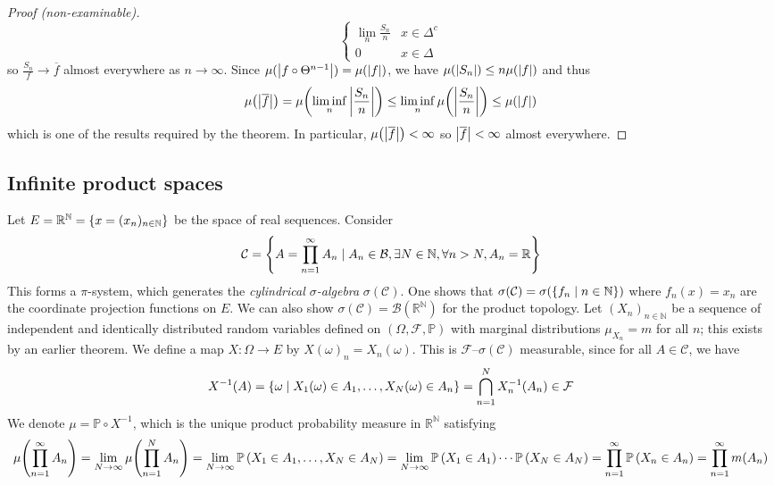 \begin{proof}[Proof (non-examinable)]
\[\begin{cases}
        \lim_n \frac{S_n}{n} & x \in \Delta^c \\
        0 & x \in \Delta
    \end{cases} \]
    so \( \frac{S_n}{f} \to \overline f \) almost everywhere as \( n \to \infty \).
    Since \( \mu(\abs{f \circ \Theta^{n-1}}) = \mu(\abs{f}) \), we have \( \mu(\abs{S_n}) \leq n \mu(\abs{f}) \) and thus
    \[ \mu\qty(\abs{\overline f}) = \mu\qty(\liminf_n \abs{\frac{S_n}{n}}) \leq \liminf_n \mu\qty(\abs{\frac{S_n}{n}}) \leq \mu(\abs{f}) \]
    which is one of the results required by the theorem.
    In particular, \( \mu\qty(\abs{\overline f}) < \infty \) so \( \abs{\overline f} < \infty \) almost everywhere.
\end{proof}

\subsection{Infinite product spaces}
Let \( E = \mathbb R^{\mathbb N} = \qty{x = (x_n)_{n \in \mathbb N}} \) be the space of real sequences.
Consider
\[ \mathcal C = \qty{A = \prod_{n=1}^\infty A_n \mid A_n \in \mathcal B, \exists N \in \mathbb N, \forall n > N, A_n = \mathbb R} \]
This forms a \( \pi \)-system, which generates the \emph{cylindrical \( \sigma \)-algebra} \( \sigma(\mathcal C) \).
One shows that \( \sigma(\mathcal C) = \sigma(\qty{f_n \mid n \in \mathbb N}) \) where \( f_n(x) = x_n \) are the coordinate projection functions on \( E \).
We can also show \( \sigma(\mathcal C) = \mathcal B(\mathbb R^{\mathbb N}) \) for the product topology.
Let \( (X_n)_{n \in \mathbb N} \) be a sequence of independent and identically distributed random variables defined on \( (\Omega, \mathcal F, \mathbb P) \) with marginal distributions \( \mu_{X_n} = m \) for all \( n \); this exists by an earlier theorem.
We define a map \( X \colon \Omega \to E \) by \( X(\omega)_n = X_n(\omega) \).
This is \( \mathcal F \)--\( \sigma(\mathcal C) \) measurable, since for all \( A \in \mathcal C \), we have
\[ X^{-1}(A) = \qty{\omega \mid X_1(\omega) \in A_1, \dots, X_N(\omega) \in A_n} = \bigcap_{n=1}^N X_n^{-1}(A_n) \in \mathcal F \]
We denote \( \mu = \mathbb P \circ X^{-1} \), which is the unique product probability measure in \( \mathbb R^{\mathbb N} \) satisfying
\[ \mu\qty(\prod_{n=1}^\infty A_n) = \lim_{N \to \infty} \mu\qty(\prod_{n=1}^N A_n) = \lim_{N \to \infty} \mathbb{P}\left({X_1 \in A_1, \dots, X_N \in A_N}\right) = \lim_{N \to \infty} \mathbb{P}\left({X_1 \in A_1}\right) \cdots \mathbb{P}\left({X_N \in A_N}\right) = \prod_{n=1}^\infty \mathbb{P}\left({X_n \in A_n}\right) = \prod_{n=1}^\infty m(A_n) \]
